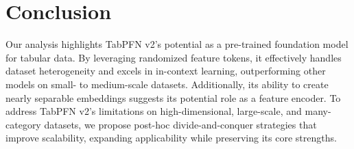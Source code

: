 \section{Conclusion}
Our analysis highlights TabPFN v2's potential as a pre-trained foundation model for tabular data. By leveraging randomized feature tokens, it effectively handles dataset heterogeneity and excels in in-context learning, outperforming other models on small- to medium-scale datasets. Additionally, its ability to create nearly separable embeddings suggests its potential role as a feature encoder.
To address TabPFN v2's limitations on high-dimensional, large-scale, and many-category datasets, we propose post-hoc divide-and-conquer strategies that improve scalability, expanding applicability while preserving its core strengths.